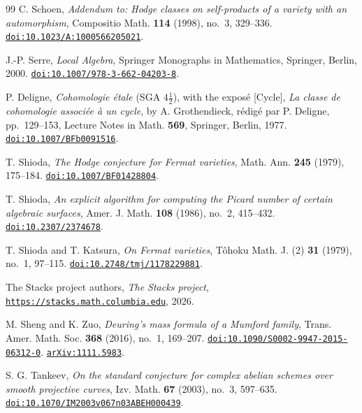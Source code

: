 \begin{thebibliography}{99}
C. Schoen,
\emph{Addendum to: Hodge classes on self-products of a variety with an
automorphism},
Compositio Math. \textbf{114} (1998), no.~3, 329--336.
\href{https://doi.org/10.1023/A:1000566205021}{\texttt{doi:10.1023/A:1000566205021}}.

J.-P. Serre,
\emph{Local Algebra},
Springer Monographs in Mathematics,
Springer, Berlin, 2000.
\href{https://doi.org/10.1007/978-3-662-04203-8}{\texttt{doi:10.1007/978-3-662-04203-8}}.

P. Deligne,
\emph{Cohomologie \'etale} (SGA $4\frac{1}{2}$), with the expos\'e
[Cycle], \emph{La classe de cohomologie associ\'ee \`a un cycle}, by
A. Grothendieck, r\'edig\'e par P. Deligne, pp.~129--153,
Lecture Notes in Math. \textbf{569}, Springer, Berlin, 1977.
\href{https://doi.org/10.1007/BFb0091516}{\texttt{doi:10.1007/BFb0091516}}.

T. Shioda,
\emph{The Hodge conjecture for Fermat varieties},
Math. Ann. \textbf{245} (1979), 175--184.
\href{https://doi.org/10.1007/BF01428804}{\texttt{doi:10.1007/BF01428804}}.

T. Shioda,
\emph{An explicit algorithm for computing the Picard number of certain
algebraic surfaces},
Amer. J. Math. \textbf{108} (1986), no.~2, 415--432.
\href{https://doi.org/10.2307/2374678}{\texttt{doi:10.2307/2374678}}.

T. Shioda and T. Katsura,
\emph{On Fermat varieties},
T\^ohoku Math. J. (2) \textbf{31} (1979), no.~1, 97--115.
\href{https://doi.org/10.2748/tmj/1178229881}{\texttt{doi:10.2748/tmj/1178229881}}.

The Stacks project authors,
\emph{The Stacks project},
\href{https://stacks.math.columbia.edu}{\texttt{https://stacks.math.columbia.edu}},
2026.

M. Sheng and K. Zuo,
\emph{Deuring's mass formula of a Mumford family},
Trans. Amer. Math. Soc. \textbf{368} (2016), no.~1, 169--207.
\href{https://doi.org/10.1090/S0002-9947-2015-06312-0}%
{\texttt{doi:10.1090/S0002-9947-2015-06312-0}}.
\href{https://arxiv.org/abs/1111.5983}{\texttt{arXiv:1111.5983}}.

S. G. Tankeev,
\emph{On the standard conjecture for complex abelian schemes over smooth
projective curves},
Izv. Math. \textbf{67} (2003), no.~3, 597--635.
\href{https://doi.org/10.1070/IM2003v067n03ABEH000439}{\texttt{doi:10.1070/IM2003v067n03ABEH000439}}.


\end{thebibliography}
